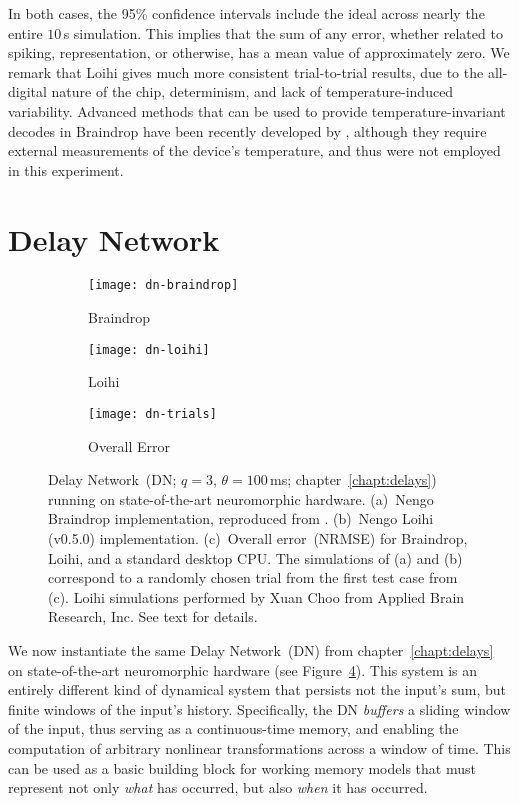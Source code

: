 In both cases, the 95\% confidence intervals include the ideal across nearly the entire $10$\,s simulation.
This implies that the sum of any error, whether related to spiking, representation, or otherwise, has a mean value of approximately zero.
We remark that Loihi gives much more consistent trial-to-trial results, due to the all-digital nature of the chip, determinism, and lack of temperature-induced variability.
Advanced methods that can be used to provide temperature-invariant decodes in Braindrop have been recently developed by \citet{reidpint2019}, although they require external measurements of the device's temperature, and thus were not employed in this experiment.

\section{Delay Network}
\label{sec:neuromorphic-dn}

\begin{figure}
  \centering
  \begin{subfigure}{.5\textwidth}
    \centering
    \texttt{[image: dn-braindrop]}
    \caption{Braindrop}
    \label{fig:dn-braindrop}
  \end{subfigure}%
  \begin{subfigure}{.5\textwidth}
    \centering
    \texttt{[image: dn-loihi]}
    \caption{Loihi}
    \label{fig:dn-loihi}
  \end{subfigure}
  \begin{subfigure}{\textwidth}
    \centering
    \vspace{2em}
    \texttt{[image: dn-trials]}
    \caption{Overall Error}
    \label{fig:dn-trials}
  \end{subfigure}
  \caption[Dynamical memory on Braindrop and Loihi.]{ \label{fig:dn-neuromorphic}
    Delay Network~(DN; $q=3$, $\theta=100$\,ms; chapter~\ref{chapt:delays}) running on state-of-the-art neuromorphic hardware.
    (a)~Nengo Braindrop implementation, reproduced from \citet[][Figure~16]{braindrop2019}. 
    (b)~Nengo Loihi (v0.5.0) implementation.
    (c)~Overall error~(NRMSE) for Braindrop, Loihi, and a standard desktop CPU.
    The simulations of (a) and (b) correspond to a randomly chosen trial from the first test case from (c).
    Loihi simulations performed by Xuan Choo from Applied Brain Research, Inc.
    See text for details.
  }
\end{figure}

We now instantiate the same Delay Network~(DN) from chapter~\ref{chapt:delays} on state-of-the-art neuromorphic hardware (see Figure~\ref{fig:dn-neuromorphic}).
This system is an entirely different kind of dynamical system that persists not the input's sum, but finite windows of the input's history.
Specifically, the DN \emph{buffers} a sliding window of the input, thus serving as a continuous-time memory, and enabling the computation of arbitrary nonlinear transformations across a window of time.
This can be used as a basic building block for working memory models that must represent not only \emph{what} has occurred, but also \emph{when} it has occurred.

